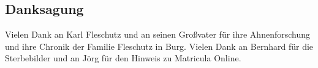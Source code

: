 \documentclass[
]{article}
\begin{document}
\subsection{Danksagung}\label{header-n373}

Vielen Dank an Karl Fleschutz und an seinen Großvater für ihre
Ahnenforschung und ihre Chronik der Familie Fleschutz in Burg. Vielen
Dank an Bernhard für die Sterbebilder und an Jörg für den Hinweis zu
Matricula Online.
\end{document}
